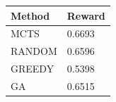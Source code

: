 \begin{tabular}{ll}
\hline
Method & Reward \\
\hline
  MCTS & 0.6693 \\
  RANDOM & 0.6596 \\
  GREEDY & 0.5398 \\
  GA & 0.6515 \\
\hline
\end{tabular}
